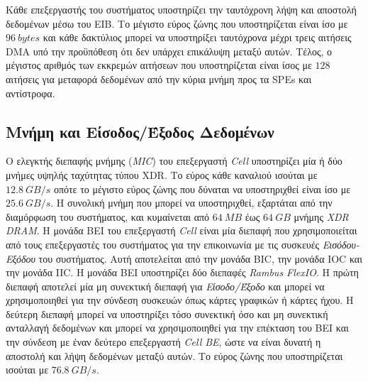 \indent
Κάθε επεξεργαστής του συστήματος υποστηρίζει την ταυτόχρονη λήψη και αποστολή δεδομένων μέσω του \ac{EIB}.
Το μέγιστο εύρος ζώνης που υποστηρίζεται είναι ίσο με \(96\ bytes\) και κάθε δακτύλιος μπορεί να υποστηρίξει ταυτόχρονα μέχρι τρεις αιτήσεις \ac{DMA} υπό την προϋπόθεση ότι δεν υπάρχει επικάλυψη μεταξύ αυτών. Τέλος, ο μέγιστος αριθμός των εκκρεμών αιτήσεων που υποστηρίζεται είναι ίσος με \(128\) αιτήσεις για μεταφορά δεδομένων από την κύρια μνήμη προς τα \acp{SPE} και αντίστροφα.

\subsection[3.2.4 Μνήμη και Είσοδος/Έξοδος Δεδομένων]{Μνήμη και Είσοδος/Έξοδος Δεδομένων}
\label{subsection:sub324}
Ο ελεγκτής διεπαφής μνήμης (\textsl{MIC}) του επεξεργαστή \textsl{Cell} υποστηρίζει μία ή δύο μνήμες υψηλής ταχύτητας τύπου \acf{XDR}. Το εύρος κάθε καναλιού ισούται με \(12.8\ GB/s\) οπότε το μέγιστο εύρος ζώνης που δύναται να υποστηριχθεί είναι ίσο με \(25.6\ GB/s\). Η συνολική μνήμη που μπορεί να υποστηριχθεί, εξαρτάται από την διαμόρφωση του συστήματος, και κυμαίνεται από \(64\ MB\) έως \(64\ GB\) μνήμης \textsl{XDR DRAM}.\newline \indent
Η μονάδα \acf{BEI} του επεξεργαστή \textsl{Cell} είναι μία διεπαφή που χρησιμοποιείται από τους επεξεργαστές του συστήματος για την επικοινωνία με τις συσκευές \textsl{Εισόδου-Εξόδου} του συστήματος. Αυτή αποτελείται από την μονάδα \acf{BIC}, την μονάδα \acf{IOC} και την μονάδα \acf{IIC}. Η μονάδα \ac{BEI} υποστηρίζει δύο διεπαφές \textsl{Rambus FlexIO}. Η πρώτη διεπαφή αποτελεί μία μη συνεκτική διεπαφή για \textsl{Είσοδο/Έξοδο} και μπορεί να χρησιμοποιηθεί για την σύνδεση συσκευών όπως κάρτες γραφικών ή κάρτες ήχου. Η δεύτερη διεπαφή μπορεί να υποστηρίξει τόσο συνεκτική όσο και μη συνεκτική ανταλλαγή δεδομένων και μπορεί να χρησιμοποιηθεί για την επέκταση του \ac{BEI} και την σύνδεση με έναν δεύτερο επεξεργαστή \textsl{Cell BE}, ώστε να είναι δυνατή η αποστολή και λήψη δεδομένων μεταξύ αυτών. Το εύρος ζώνης που υποστηρίζεται ισούται με \(76.8\ GB/s\).

